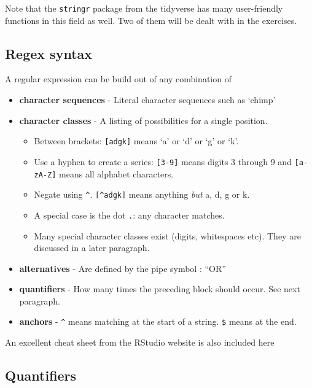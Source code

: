 \documentclass[]{book}
\providecommand{\tightlist}{%
  \setlength{\itemsep}{0pt}\setlength{\parskip}{0pt}}
\begin{document}
Note that the \texttt{stringr} package from the tidyverse has many user-friendly functions in this field as well. Two of them will be dealt with in the exercises.

\hypertarget{regex-syntax}{%
\subsection{Regex syntax}\label{regex-syntax}}

A regular expression can be build out of any combination of

\begin{itemize}
\tightlist
\item
  \textbf{character sequences} - Literal character sequences such as `chimp'\\
\item
  \textbf{character classes} - A listing of possibilities for a single position.

  \begin{itemize}
  \tightlist
  \item
    Between brackets: \texttt{{[}adgk{]}} means `a' or `d' or `g' or `k'.
  \item
    Use a hyphen to create a series: \texttt{{[}3-9{]}} means digits 3 through 9 and \texttt{{[}a-zA-Z{]}} means all alphabet characters.
  \item
    Negate using \texttt{\^{}}. \texttt{{[}\^{}adgk{]}} means anything \emph{but} a, d, g or k.
  \item
    A special case is the dot \texttt{.}: any character matches.\\
  \item
    Many special character classes exist (digits, whitespaces etc). They are discussed in a later paragraph.
  \end{itemize}
\item
  \textbf{alternatives} - Are defined by the pipe symbol \texttt{\textbar{}}: ``OR''\\
\item
  \textbf{quantifiers} - How many times the preceding block should occur. See next paragraph.\\
\item
  \textbf{anchors} - \texttt{\^{}} means matching at the start of a string. \texttt{\$} means at the end.
\end{itemize}

An excellent cheat sheet from the RStudio website is also included
here

\hypertarget{quantifiers}{%
\subsection{Quantifiers}\label{quantifiers}}
\end{document}
